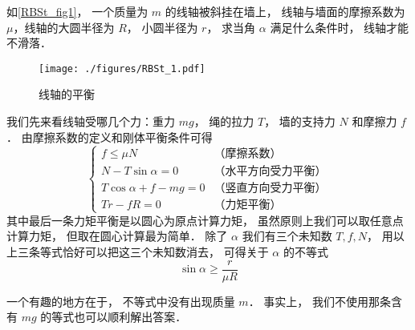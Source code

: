 \begin{example}{}\label{RBSt_ex1}
如\autoref{RBSt_fig1}， 一个质量为 $m$ 的线轴被斜挂在墙上， 线轴与墙面的摩擦系数为 $\mu$，线轴的大圆半径为 $R$， 小圆半径为 $r$， 求当角 $\alpha$ 满足什么条件时， 线轴才能不滑落．
\begin{figure}[ht]
\centering
\texttt{[image: ./figures/RBSt\_1.pdf]}
\caption{线轴的平衡} \label{RBSt_fig1}
\end{figure}

我们先来看线轴受哪几个力：重力 $mg$， 绳的拉力 $T$， 墙的支持力 $N$ 和摩擦力 $f$． 由摩擦系数的定义和刚体平衡条件可得
\begin{equation}
\begin{cases}
f \leqslant \mu N & \text{（摩擦系数）}\\
N - T\sin\alpha = 0 & \text{（水平方向受力平衡）}\\
T\cos\alpha + f - mg = 0 & \text{（竖直方向受力平衡）}\\
Tr - fR = 0 & \text{（力矩平衡）}
\end{cases}
\end{equation}
其中最后一条力矩平衡是以圆心为原点计算力矩， 虽然原则上我们可以取任意点计算力矩， 但取在圆心计算最为简单． 除了 $\alpha$ 我们有三个未知数 $T, f, N$， 用以上三条等式恰好可以把这三个未知数消去， 可得关于 $\alpha$ 的不等式
\begin{equation}
\sin\alpha \geqslant \frac{r}{\mu R}
\end{equation}

一个有趣的地方在于， 不等式中没有出现质量 $m$． 事实上， 我们不使用那条含有 $mg$ 的等式也可以顺利解出答案．
\end{example}

